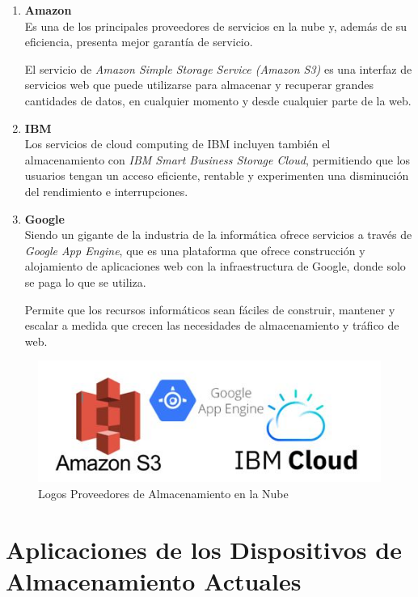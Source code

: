 \documentclass[10pt,journal]{IEEEtran}
\begin{document}
\begin{itemize}
    \begin{enumerate}
        \item {\large \textbf{Amazon}} \\
        Es una de los principales proveedores de servicios en la nube y, además de su eficiencia, presenta mejor garantía de servicio.
        
        El servicio de \textit{Amazon Simple Storage Service (Amazon S3)} es una interfaz de servicios web que puede utilizarse para almacenar y recuperar grandes cantidades de datos, en cualquier momento y desde cualquier parte de la web.
        \item {\large \textbf{IBM}} \\
        Los servicios de cloud computing de IBM incluyen también el almacenamiento con \textit{IBM Smart Business Storage Cloud}, permitiendo que los usuarios tengan un acceso eficiente, rentable y experimenten una disminución del rendimiento e interrupciones.
        \item {\large \textbf{Google}} \\
        Siendo un gigante de la industria de la informática ofrece servicios a través de \textit{Google App Engine}, que es una plataforma que ofrece construcción y alojamiento de aplicaciones web con la infraestructura de Google, donde solo se paga lo que se utiliza.
        
        Permite que los recursos informáticos sean fáciles de construir, mantener y escalar a medida que crecen las necesidades de almacenamiento y tráfico de web.
    \end{enumerate}
    
    \begin{figure}[H]
        \begin{center}
            \includegraphics[width=0.5 \textwidth]{logos.JPG}
            \caption{Logos Proveedores de Almacenamiento en la Nube}
            \label{f4} 
        \end{center}
    \end{figure}
    \end{itemize}
    
    \section{\textbf{Aplicaciones de los Dispositivos de Almacenamiento Actuales}}
    
\end{document}
